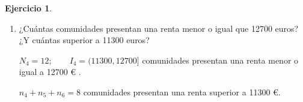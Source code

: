 \documentclass[a4paper, 12pt]{article}
\theoremstyle{definition}
\newtheorem{ej}{Ejercicio}
\begin{document}
\begin{ej}
\begin{enumerate}[label=\textit{\alph*)}]
    \begin{figure}[h!]
        \centering
        \begin{subfigure}[b]{0.45\linewidth}
        \texttt{[image: imagenes/Histograma\_ejer\_3.png]}
        \caption{Histograma y poligonal de frecuencias}
        \end{subfigure}
        \begin{subfigure}[b]{0.45\linewidth}
        \texttt{[image: imagenes/Curva de distrubicon\_ejer3.png]}
        \caption{Curva de distribución}
        \end{subfigure}
    \end{figure}
    
    \item ¿Cuántas comunidades presentan una renta menor o igual que 12700 euros? ¿Y cuántas superior a 11300 euros?
    
    \(N_4 = 12 ; \qquad I_4 = (11300,12700] \)  comunidades presentan una renta menor o igual a 12700 \textup{\euro} .
    
    \(n_4 + n_5 + n_6 = 8\)  comunidades presentan una renta superior a 11300 \textup{\euro}.
    
\end{enumerate}


\end{ej}
\end{document}
